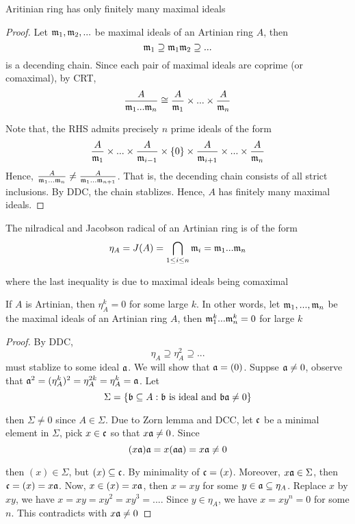 \begin{proposition}
	Aritinian ring has only finitely many maximal ideals
\end{proposition}

\begin{proof}
	Let $\mathfrak{m}_1, \mathfrak{m}_2, ...$ be maximal ideals of an Artinian ring $A$, then
	$$
		\mathfrak{m}_1 \supseteq \mathfrak{m}_1 \mathfrak{m}_2 \supseteq ...
	$$
	is a decending chain. Since each pair of maximal ideals are coprime (or comaximal), by CRT,
	$$
		\frac{A}{\mathfrak{m}_1 ... \mathfrak{m}_n} \cong \frac{A}{\mathfrak{m}_1} \times ... \times  \frac{A}{\mathfrak{m}_n}
	$$
	
	Note that, the RHS admits precisely $n$ prime ideals of the form
	$$
		\frac{A}{\mathfrak{m}_1} \times ... \times \frac{A}{\mathfrak{m}_{i-1}} \times \{0\} \times  \frac{A}{\mathfrak{m}_{i+1}} \times ... \times  \frac{A}{\mathfrak{m}_n}
	$$
	Hence, $\frac{A}{\mathfrak{m}_1 ... \mathfrak{m}_n} \neq \frac{A}{\mathfrak{m}_1 ... \mathfrak{m}_{n+1}}$. That is, the decending chain consists of all strict inclusions. By DDC, the chain stablizes. Hence, $A$ has finitely many maximal ideals.
\end{proof}

\begin{corollary}
	The nilradical and Jacobson radical of an Artinian ring is of the form
	$$
		\eta_A = J(A) = \bigcap_{1 \leq i \leq n} \mathfrak{m}_i = \mathfrak{m}_1 ... \mathfrak{m}_n
	$$
	
	where the last inequality is due to maximal ideals being comaximal
\end{corollary}

\begin{proposition}
	If $A$ is Artinian, then $\eta_A^k = 0$ for some large $k$. In other words, let $\mathfrak{m}_1, ..., \mathfrak{m}_n$ be the maximal ideals of an Artinian ring $A$, then $\mathfrak{m}_1^k ... \mathfrak{m}_n^k = 0$ for large $k$	
\end{proposition}

\begin{proof}
	By DDC, 
	$$
		\eta_A \supseteq \eta_A^2 \supseteq ...
	$$
	must stablize to some ideal $\mathfrak{a}$. We will show that $\mathfrak{a} = (0)$. Suppse $\mathfrak{a} \neq 0$, observe that $\mathfrak{a}^2 = (\eta_A^k)^2 = \eta_A^{2k} = \eta_A^k = \mathfrak{a}$. Let 
	$$
		\Sigma = \{\mathfrak{b} \subseteq A: \mathfrak{b} \text{ is ideal and } \mathfrak{b} \mathfrak{a} \neq 0\}
	$$
	
	then $\Sigma \neq 0$ since $A \in \Sigma$. Due to Zorn lemma and DCC, let $\mathfrak{c}$ be a minimal element in $\Sigma$, pick $x \in \mathfrak{c}$ so that $x \mathfrak{a} \neq 0$. Since
	$$
		(x \mathfrak{a}) \mathfrak{a} = x (\mathfrak{a} \mathfrak{a}) = x \mathfrak{a} \neq 0
	$$
	
	then $(x) \in \Sigma$, but $(x) \subseteq \mathfrak{c}$. By minimality of $\mathfrak{c} = (x)$. Moreover, $x \mathfrak{a} \in \Sigma$, then $\mathfrak{c} = (x) = x \mathfrak{a}$. Now, $x \in (x) = x \mathfrak{a}$, then $x = xy$ for some $y \in \mathfrak{a} \subseteq \eta_A$. Replace $x$ by $xy$, we have $x = xy = xy^2 = xy^3 = ...$. Since $y \in \eta_A$, we have $x = xy^n = 0$ for some $n$. This contradicts with $x \mathfrak{a} \neq 0$
\end{proof}



